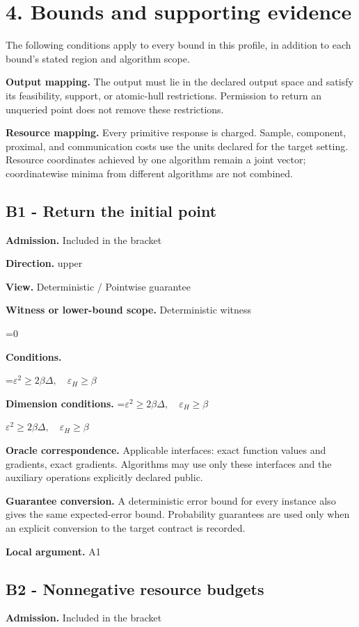 \documentclass[10pt,a4paper]{article}
\newcommand{\AtlasMath}[1]{\par\begingroup\centering\setbox0=\hbox{$\displaystyle #1$}\ifdim\wd0>1.4\linewidth\typeout{ATLAS WIDE FORMULA: \the\wd0}\fi\ifdim\wd0>\linewidth\resizebox{\linewidth}{!}{\box0}\else\box0\fi\par\endgroup}
\newcommand{\AtlasInlineMath}[1]{\begingroup\setbox0=\hbox{$#1$}\ifdim\wd0>.4\linewidth\endgroup\AtlasMath{#1}\else\endgroup$#1$\fi}
\begin{document}
\section{4. Bounds and supporting evidence}
The following conditions apply to every bound in this profile, in addition to each bound's stated region and algorithm scope.

\textbf{Output mapping.} The output must lie in the declared output space and satisfy its feasibility, support, or atomic-hull restrictions. Permission to return an unqueried point does not remove these restrictions.

\textbf{Resource mapping.} Every primitive response is charged. Sample, component, proximal, and communication costs use the units declared for the target setting. Resource coordinates achieved by one algorithm remain a joint vector; coordinatewise minima from different algorithms are not combined.

\subsection{B1 - Return the initial point}
\textbf{Admission.} Included in the bracket

\textbf{Direction.} upper

\textbf{View.} Deterministic / Pointwise guarantee

\textbf{Witness or lower-bound scope.} Deterministic witness

\AtlasMath{0}
\textbf{Conditions.} 
\AtlasMath{\varepsilon^2\ge2\beta\Delta,\quad\varepsilon_H\ge\beta}


\textbf{Dimension conditions.} \AtlasInlineMath{\varepsilon^2\ge2\beta\Delta,\quad\varepsilon_H\ge\beta}

\textbf{Oracle correspondence.} Applicable interfaces: exact function values and gradients, exact gradients. Algorithms may use only these interfaces and the auxiliary operations explicitly declared public.

\textbf{Guarantee conversion.} A deterministic error bound for every instance also gives the same expected-error bound. Probability guarantees are used only when an explicit conversion to the target contract is recorded.

\textbf{Local argument.} A1

\subsection{B2 - Nonnegative resource budgets}
\textbf{Admission.} Included in the bracket
\end{document}
